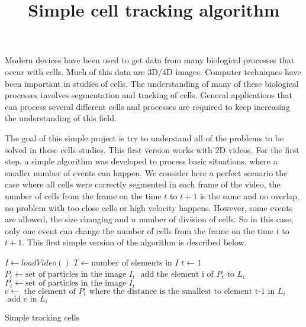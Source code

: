 \documentclass{article}
\title{Simple cell tracking algorithm}
\begin{document}
\maketitle	

Modern devices have been used to get data from many biological processes that occur with cells. Much of this data are 3D/4D images. Computer techniques have been important in studies of cells. The understanding of many of these biological processes involves segmentation and tracking of cells. General applications that can process several different cells and processes are required to keep increasing the understanding of this field.

The goal of this simple project is try to understand all of the problems to be solved in these cells studies. This first version works with 2D videos. For the first step, a simple algorithm was developed to process basic situations, where a smaller number of events can happen. We consider here a perfect scenario the case where all cells were correctly segmented in each frame of the video, the number of cells from the frame on the time \(t\) to \(t+1\) is the same and no overlap, no problem with too close cells or high velocity happens. However, some events are allowed, the size changing and \(n\) number of division of cells. So in this case, only one event can change the number of cells from the frame on the time \(t\) to \(t+1\). This first simple version of the algorithm is described below.\\

\begin{algorithm}[H]
 $I\gets loadVideo()$ \;
 $T\gets \text{number of elements in } I$ \;
 $t\gets 1$ \;
 $P_t \gets \text{set of particles in the image } I_t$ \;
 {
   $\text{ add the element i of } P_t \text{ to } L_i$
 }
 {
 $P_t \gets \text{set of particles in the image } I_t$ \;
	 {
		  $c \gets \text{ the element of } P_{t} \text{ where the distance is the smallest to element t-1 in } L_{i}$
		  $\text{ add c in } L_i$
	 }
 }
 \caption{Simple tracking cells}
\end{algorithm}
\end{document}

